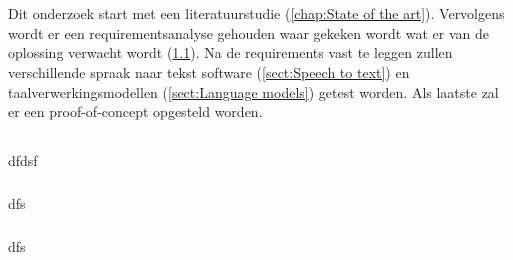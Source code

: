 
\chapter{}%
\label{ch:methodologie}



Dit onderzoek start met een literatuurstudie (\ref{chap:State of the art}). Vervolgens wordt er een requirementsanalyse gehouden waar gekeken wordt wat er van de oplossing verwacht wordt (\ref{sect:Requirements analysis}). Na de requirements vast te leggen zullen verschillende spraak naar tekst software (\ref{sect:Speech to text}) en taalverwerkingsmodellen (\ref{sect:Language models}) getest worden. Als laatste zal er een proof-of-concept opgesteld worden.

\section{} \label{sect:Requirements analysis}%

dfdsf

\paragraph{}

dfs

\paragraph{}

dfs

\subsection{}%

